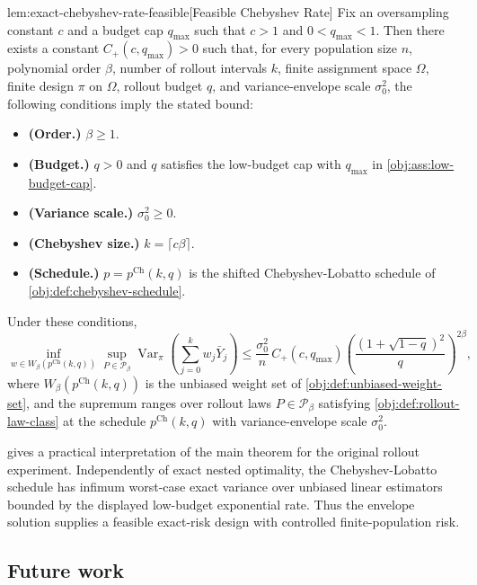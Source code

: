 \documentclass[11pt]{article}
\begin{document}
\begin{propositionv}{lem:exact-chebyshev-rate-feasible}[Feasible Chebyshev Rate]
Fix an oversampling constant \(c\) and a budget cap \(q_{\max}\) such that \(c>1\) and \(0<q_{\max}<1\). Then there exists a constant \(C_+(c,q_{\max})>0\) such that, for every population size \(n\), polynomial order \(\beta\), number of rollout intervals \(k\), finite assignment space \(\Omega\), finite design \(\pi\) on \(\Omega\), rollout budget \(q\), and variance-envelope scale \(\sigma_0^2\), the following conditions imply the stated bound:
\begin{itemize}
\item \textbf{(Order.)} \(\beta\ge 1\).
\item \textbf{(Budget.)} \(q>0\) and \(q\) satisfies the low-budget cap with \(q_{\max}\) in \cref{obj:ass:low-budget-cap}.
\item \textbf{(Variance scale.)} \(\sigma_0^2\ge 0\).
\item \textbf{(Chebyshev size.)} \(k=\lceil c\beta\rceil\).
\item \textbf{(Schedule.)} \(p=p^{\mathrm{Ch}}(k,q)\) is the shifted Chebyshev-Lobatto schedule of \cref{obj:def:chebyshev-schedule}.
\end{itemize}
Under these conditions,
\[
\inf_{w\in W_\beta(p^{\mathrm{Ch}}(k,q))}
\sup_{P\in\mathcal P_\beta}
\operatorname{Var}_\pi\!\left(\sum_{j=0}^k w_j\bar Y_j\right)
\le
\frac{\sigma_0^2}{n}\,
C_+(c,q_{\max})
\left(\frac{(1+\sqrt{1-q})^2}{q}\right)^{2\beta},
\]
where \(W_\beta(p^{\mathrm{Ch}}(k,q))\) is the unbiased weight set of \cref{obj:def:unbiased-weight-set}, and the supremum ranges over rollout laws \(P\in\mathcal P_\beta\) satisfying \cref{obj:def:rollout-law-class} at the schedule \(p^{\mathrm{Ch}}(k,q)\) with variance-envelope scale \(\sigma_0^2\).
\end{propositionv}

 gives a practical interpretation of the main theorem for the original rollout experiment. Independently of exact nested optimality, the Chebyshev-Lobatto schedule has infimum worst-case exact variance over unbiased linear estimators bounded by the displayed low-budget exponential rate. Thus the envelope solution supplies a feasible exact-risk design with controlled finite-population risk.

\subsection{Future work}
\end{document}
